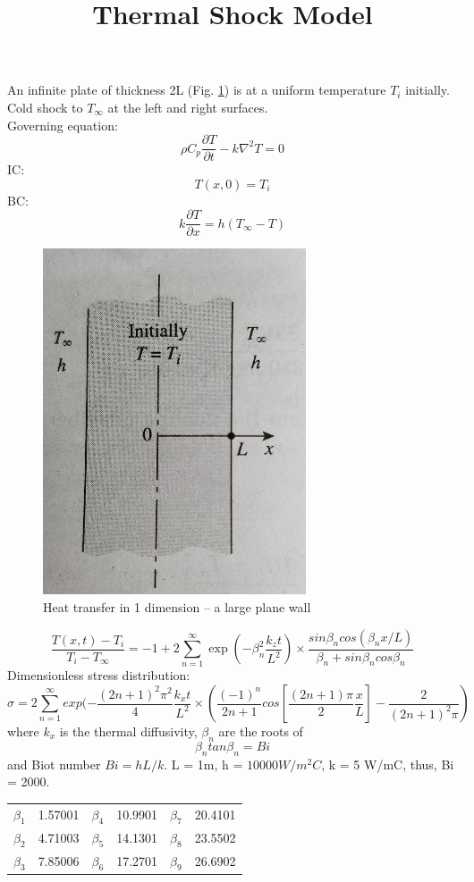 \documentclass[12pt]{article}
\begin{document}
 
\title{Thermal Shock Model }
\maketitle
An infinite plate \cite{thermalShock_solid} of thickness 2L (Fig. \ref{1d}) is at a uniform temperature $T_i$ initially.  Cold shock to $T_{\infty}$ at the left and right surfaces.  \\

Governing equation: 
\[\rho C_p \frac{\partial T}{\partial t} - k \nabla^2 T = 0 \]
IC:
\[T(x,0) = T_i\]
BC:
\[k\frac{\partial T}{\partial x} = h(T_{\infty} - T) \]

\begin{figure}[h]
\centering
\includegraphics[width=0.40 \textwidth]{1d.png}
\caption{Heat transfer in 1 dimension -- a large plane wall }
\label{1d}
\end{figure}

\begin{equation} \label{T_FS}
\frac{T(x,t) - T_i}{T_i - T_{\infty}} = -1 + 2 \sum ^{\infty} _{n=1} \exp(-\beta_n^2 \frac{k_z t}{L^2}) \times \frac{sin \beta_n cos(\beta_nx/L)}{\beta_n + sin \beta_n cos \beta_n} 
\end{equation}
Dimensionless stress distribution:
\[\sigma = 2 \sum ^{\infty} _{n=1} exp ( -\frac{(2n+1)^2\pi^2}{4} \frac{k_x t}{L^2} \times \left(\frac{(-1)^n}{2n+1} cos [\frac{(2n+1)\pi}{2} \frac{x}{L}] - \frac{2}{(2n+1)^2 \pi}\right) \]
where $k_x$ is the thermal diffusivity, $\beta_n$ are the roots of \[\beta_n tan \beta_n = Bi\]
and Biot number $Bi = hL/k$.  
L = 1m, h = $10000 W/m^2C$, k = 5 W/mC, thus, Bi = 2000.


\begin{center}
\begin{tabular}{ |c|c||c|c||c|c|| } 
 \hline
 $\beta_1$ & 1.57001 & $\beta_4$ & 10.9901 & $\beta_7$ & 20.4101 \\ 
 $\beta_2$ & 4.71003 & $\beta_5$ & 14.1301 & $\beta_8$ &  23.5502 \\ 
 $\beta_3$ & 7.85006 & $\beta_6$ & 17.2701 & $\beta_9$ & 26.6902 \\ 
 \hline
\end{tabular}
\end{center}
\end{document}

